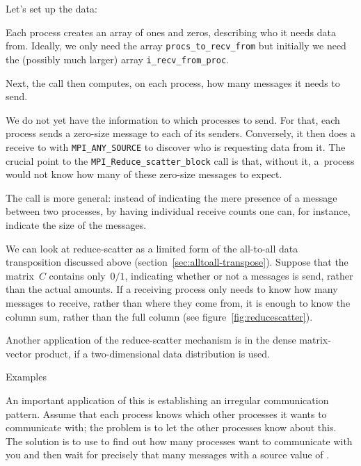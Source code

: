 Let's set up the data:
%

Each process creates an array of ones and zeros, describing who
it needs data from.
Ideally, we only need the array \lstinline+procs_to_recv_from+
but initially we need the (possibly much larger) array
\lstinline+i_recv_from_proc+.

Next, the  call then
computes, on each process, how many messages it needs to send.
%

We do not yet have the information to which processes to send.
For that, each process sends a zero-size message to
each of its senders.
Conversely, it then does a receive to with \lstinline+MPI_ANY_SOURCE+
to discover who is requesting data from it.
The crucial point to the \lstinline+MPI_Reduce_scatter_block+ call
is that, without it, a~process would not know how many
of these zero-size messages to expect.


The  call is more general:
instead of indicating the mere presence of a message
between two processes,
by having individual receive counts one can, for instance,
indicate the size of the messages.

We can look at reduce-scatter as a limited form of the all-to-all data
transposition discussed above (section~\ref{sec:alltoall-transpose}).
Suppose that the matrix~$C$ contains only~$0/1$, indicating
whether or not a messages is send, rather than the actual amounts.
If a receiving process only needs to know how many messages to
receive, rather than where they come from, it is enough to know the
column sum, rather than the full column (see figure~\ref{fig:reducescatter}).

Another application of the reduce-scatter mechanism is in the
dense matrix-vector product, if a two-dimensional data distribution
is used.

 {Examples}

An important application of this is establishing an irregular
communication pattern.  Assume that each process knows which
other processes it wants to communicate with; the problem is to
let the other processes know about this.
The solution is to use  to find out how many processes
want to communicate with you
and then wait for precisely that many messages
with a source value of .

